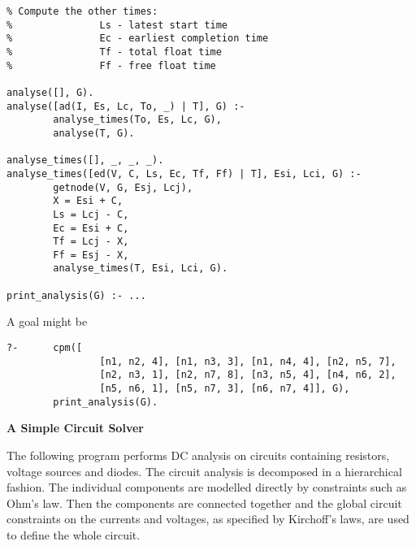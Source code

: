\begin{verbatim}
% Compute the other times:
%               Ls - latest start time
%               Ec - earliest completion time
%               Tf - total float time
%               Ff - free float time

analyse([], G).
analyse([ad(I, Es, Lc, To, _) | T], G) :-
        analyse_times(To, Es, Lc, G),
        analyse(T, G).

analyse_times([], _, _, _).
analyse_times([ed(V, C, Ls, Ec, Tf, Ff) | T], Esi, Lci, G) :-
        getnode(V, G, Esj, Lcj),
        X = Esi + C,
        Ls = Lcj - C,
        Ec = Esi + C,
        Tf = Lcj - X,
        Ff = Esj - X,
        analyse_times(T, Esi, Lci, G).

print_analysis(G) :- ...

\end{verbatim}

A goal might be 

\begin{verbatim}
?-      cpm([
                [n1, n2, 4], [n1, n3, 3], [n1, n4, 4], [n2, n5, 7],
                [n2, n3, 1], [n2, n7, 8], [n3, n5, 4], [n4, n6, 2], 
                [n5, n6, 1], [n5, n7, 3], [n6, n7, 4]], G),
        print_analysis(G).
\end{verbatim}

\noindent
{\bf A Simple Circuit Solver}

The following program performs DC analysis on circuits
containing resistors, voltage sources and diodes.
The circuit analysis is decomposed in a hierarchical fashion.
The individual components are modelled directly by constraints
such as Ohm's law.
Then the components are connected together and the global circuit
constraints on the currents and voltages, as specified by
Kirchoff's laws, are used to define the whole circuit.

